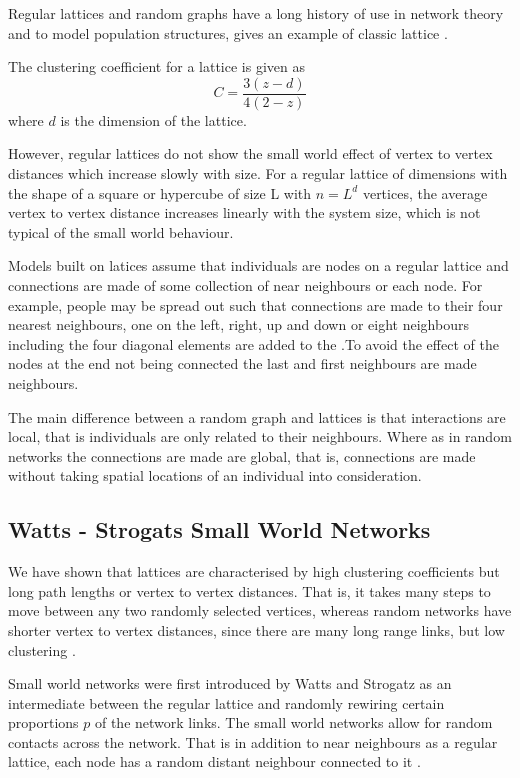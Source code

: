 Regular lattices and random graphs have a long history of use in network theory and to model population structures,  gives an example of classic lattice \citep{harris1974contact}.

The clustering coefficient for a lattice is given as  
\begin{equation}
C = \frac{3(z -d)}{4(2-z)}
\end{equation}
where $d$ is the dimension of the lattice.

However, regular lattices do not show the small world effect of vertex to vertex distances which increase slowly with size. For a regular lattice of dimensions with the shape of a square or hypercube of size L with $n = L^d$ vertices, the average vertex to vertex distance increases linearly with the system size, which is not typical of the small world behaviour.  


Models built on latices assume that individuals are  nodes on a regular lattice and connections are made of some collection of near neighbours or each node. For example, people may be spread out such that connections are made to their four nearest neighbours, one on the left, right, up and down or  eight neighbours including the four diagonal elements are added to the \citep{lloyd2006infection}.To avoid the effect of the nodes at the end not being connected the last and first neighbours are made neighbours.

The main difference between a random graph and lattices is that interactions are local, that is individuals are only related to their neighbours. Where as in random networks the connections are made are global, that is, connections are made without taking spatial locations of an individual into consideration. 

\subsection{Watts - Strogats Small World Networks}
We have shown that lattices are characterised by high clustering coefficients but long path lengths or vertex to vertex distances. That is, it takes many steps to move between any two randomly selected vertices, whereas random networks have shorter vertex to vertex distances, since there are many long range links, but low clustering \citep{keeling2005networks}.


Small world networks were first introduced by Watts and Strogatz as an intermediate between the regular lattice and randomly rewiring certain proportions $p$ of the network links\citep{watts1998collective}. The small world networks allow for random contacts across the network. That is in addition to near neighbours as a regular lattice, each node has a random distant neighbour connected to it \citep{watts1998collective}.


